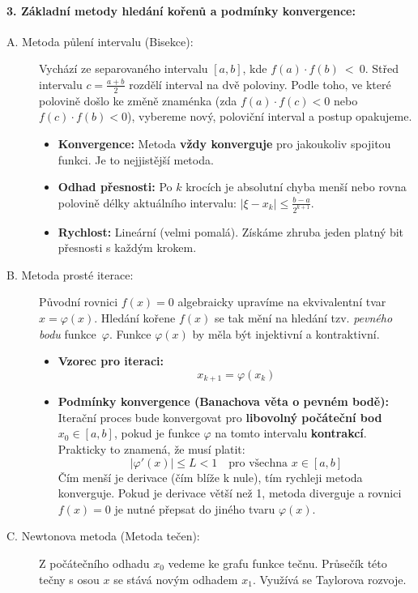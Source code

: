 \paragraph*{3. Základní metody hledání kořenů a podmínky konvergence:}
\begin{description}
    \item[A. Metoda půlení intervalu (Bisekce):] Vychází ze separovaného intervalu $[a, b]$, kde $f(a) \cdot f(b)~<~0$. Střed intervalu $c = \frac{a+b}{2}$ rozdělí interval na dvě poloviny. Podle toho, ve které polovině došlo ke změně znaménka (zda $f(a)\cdot f(c) < 0$ nebo $f(c)\cdot f(b) < 0$), vybereme nový, poloviční interval a postup opakujeme.
    \begin{itemize}
        \item \textbf{Konvergence:} Metoda \textbf{vždy konverguje} pro jakoukoliv spojitou funkci. Je to nejjistější metoda.
        \item \textbf{Odhad přesnosti:} Po $k$ krocích je absolutní chyba menší nebo rovna polovině délky aktuálního intervalu: $|\xi - x_k| \leq \frac{b-a}{2^{k+1}}$.
        \item \textbf{Rychlost:} Lineární (velmi pomalá). Získáme zhruba jeden platný bit přesnosti s každým krokem.
    \end{itemize}
    \item[B. Metoda prosté iterace:] Původní rovnici $f(x) = 0$ algebraicky upravíme na ekvivalentní tvar $x = \varphi(x)$. Hledání kořene $f(x)$ se tak mění na hledání tzv. \textit{pevného bodu} funkce~$\varphi$.
    Funkce $\varphi(x)$ by měla být injektivní a kontraktivní.
    \begin{itemize}
        \item \textbf{Vzorec pro iteraci:} 
        \[ x_{k+1} = \varphi(x_k) \]
        \item \textbf{Podmínky konvergence (Banachova věta o pevném bodě):} 
        Iterační proces bude konvergovat pro \textbf{libovolný počáteční bod} $x_0 \in [a, b]$, pokud je funkce $\varphi$ na tomto intervalu \textbf{kontrakcí}.
        Prakticky to znamená, že musí platit:
        \[ |\varphi'(x)| \leq L < 1 \quad \text{pro všechna } x \in [a, b] \]
        Čím menší je derivace (čím blíže k nule), tím rychleji metoda konverguje. Pokud je derivace větší než 1, metoda diverguje a rovnici $f(x)=0$ je nutné přepsat do jiného tvaru $\varphi(x)$.
    \end{itemize}
    \item[C. Newtonova metoda (Metoda tečen):] Z počátečního odhadu $x_0$ vedeme ke grafu funkce tečnu. Průsečík této tečny s osou $x$ se stává novým odhadem $x_1$. Využívá se Taylorova rozvoje.

\end{description}
